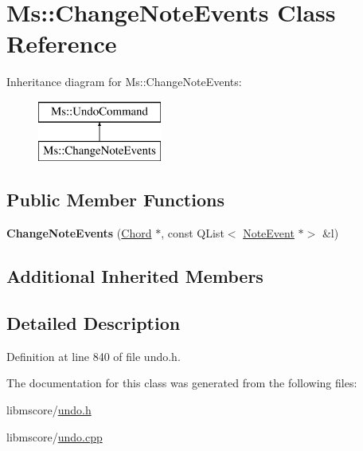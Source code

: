 \hypertarget{class_ms_1_1_change_note_events}{}\section{Ms\+:\+:Change\+Note\+Events Class Reference}
\label{class_ms_1_1_change_note_events}
Inheritance diagram for Ms\+:\+:Change\+Note\+Events\+:\begin{figure}[H]
\begin{center}
\leavevmode
\includegraphics[height=2.000000cm]{class_ms_1_1_change_note_events}
\end{center}
\end{figure}
\subsection*{Public Member Functions}
\begin{DoxyCompactItemize}
\item 
\mbox{\label{class_ms_1_1_change_note_events_a82e357de89279933b5ae83fdcd673082}} 
{\bfseries Change\+Note\+Events} (\hyperlink{class_ms_1_1_chord}{Chord} $\ast$, const Q\+List$<$ \hyperlink{class_ms_1_1_note_event}{Note\+Event} $\ast$$>$ \&l)
\end{DoxyCompactItemize}
\subsection*{Additional Inherited Members}


\subsection{Detailed Description}


Definition at line 840 of file undo.\+h.



The documentation for this class was generated from the following files\+:\begin{DoxyCompactItemize}
\item 
libmscore/\hyperlink{undo_8h}{undo.\+h}\item 
libmscore/\hyperlink{undo_8cpp}{undo.\+cpp}\end{DoxyCompactItemize}
